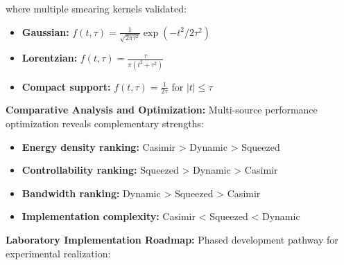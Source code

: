 \documentclass[11pt]{article}
\begin{document}
where multiple smearing kernels validated:
\begin{itemize}
    \item \textbf{Gaussian:} $f(t,\tau) = \frac{1}{\sqrt{2\pi\tau^2}}\exp(-t^2/2\tau^2)$
    \item \textbf{Lorentzian:} $f(t,\tau) = \frac{\tau}{\pi(t^2 + \tau^2)}$
    \item \textbf{Compact support:} $f(t,\tau) = \frac{1}{2\tau}$ for $|t| \leq \tau$
\end{itemize}

\textbf{Comparative Analysis and Optimization:}
Multi-source performance optimization reveals complementary strengths:

\begin{itemize}
    \item \textbf{Energy density ranking:} Casimir > Dynamic > Squeezed
    \item \textbf{Controllability ranking:} Squeezed > Dynamic > Casimir  
    \item \textbf{Bandwidth ranking:} Dynamic > Squeezed > Casimir
    \item \textbf{Implementation complexity:} Casimir < Squeezed < Dynamic
\end{itemize}

\textbf{Laboratory Implementation Roadmap:}
Phased development pathway for experimental realization:
\end{document}
